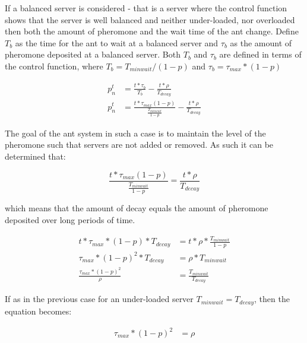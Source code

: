 \documentclass[conference]{IEEEtran}
\begin{document}
If a balanced server is considered - that is a server where the control function shows that the server is well balanced and neither under-loaded, nor overloaded then both the amount of pheromone and the wait time of the ant change. Define $T_{b}$ as the time for the ant to wait at a balanced server and $\tau_{b}$ as the amount of pheromone deposited at a balanced server. Both $T_{b}$ and $\tau_{b}$ are defined in terms of the control function, where $T_{b} = T_{minwait} / (1 - p)$ and $\tau_{b} = \tau_{max} * (1 - p)$

\begin{equation}
\begin{aligned}
p^{t}_{n} &= \frac{t *  \tau_{b}}{T_{b}} - \frac{t *  \rho}{T_{decay}} \\
p^{t}_{n} &= \frac{t *  \tau_{max}(1 - p)}{\frac{T_{minwait}}{1 - p}} - \frac{t *  \rho}{T_{decay}}
\end{aligned}
\end{equation}

The goal of the ant system in such a case is to maintain the level of the pheromone such that servers are not added or removed. As such it can be determined that:

\begin{equation}
\frac{t *  \tau_{max}(1 - p)}{\frac{T_{minwait}}{1 - p}} = \frac{t *  \rho}{T_{decay}}
\end{equation}

which means that the amount of decay equals the amount of pheromone deposited over long periods of time.

\begin{equation}
\begin{aligned}
t *  \tau_{max} * (1 - p) * T_{decay} &= t *  \rho * \frac{T_{minwait}}{1 - p} \\
\tau_{max} * (1 - p)^2 * T_{decay} &= \rho * T_{minwait} \\
\frac{\tau_{max} * (1 - p)^2}{\rho} &= \frac{T_{minwait}}{T_{decay}}
\end{aligned}
\end{equation}

If as in the previous case for an under-loaded server $T_{minwait} = T_{decay}$, then the equation becomes:

\begin{equation}
\begin{aligned}
\tau_{max} * (1 - p)^2 &= \rho
\end{aligned}
\end{equation}
\end{document}

